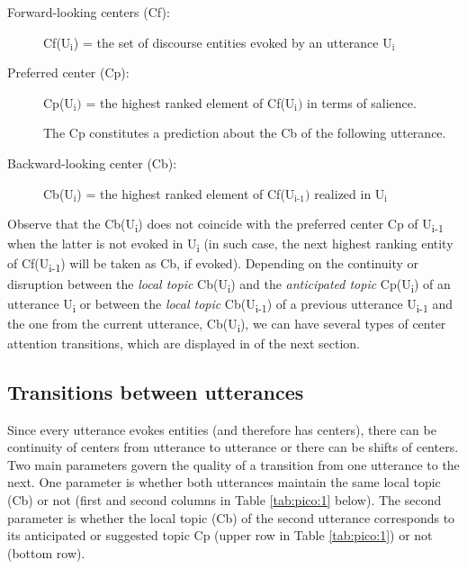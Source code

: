 \documentclass[output=paper
,modfonts
,nonflat]{langsci/langscibook}
\begin{document}
\begin{description}
\item[Forward-looking centers (Cf):] Cf(U$_\text{i}$) = the set of discourse entities evoked by an utterance U$_\text{i}$
\item[Preferred center (Cp):] Cp(U$_\text{i})$ = the highest ranked element of Cf(U$_\text{i})$ in terms of salience.

The Cp constitutes a prediction about the Cb of the following utterance.


\item[Backward-looking center (Cb):] Cb(U$_\text{i}$) = the highest ranked element of Cf(U$_\text{i-1})$ realized in U$_\text{i}$
\end{description}

Observe that the Cb(U\textsubscript{i}) does not coincide with the preferred center Cp of U\textsubscript{i-1} when the latter is not evoked in U\textsubscript{i} (in such case, the next highest ranking entity of Cf(U\textsubscript{i-1}) will be taken as Cb, if evoked). Depending on the continuity or disruption between the \textit{local topic} Cb(U\textsubscript{i}) and the \textit{anticipated topic} Cp(U\textsubscript{i}) of an utterance U\textsubscript{i} or between the \textit{local topic} Cb(U\textsubscript{i-1}) of a previous utterance U\textsubscript{i-1} and the one from the current utterance, Cb(U\textsubscript{i}), we can have several types of center attention transitions, which are displayed in  of the next section.


\subsection{Transitions between utterances}\label{sec:pico:3.3}

Since every utterance evokes entities (and therefore has centers), there can be continuity of centers from utterance to utterance or there can be shifts of centers. Two main parameters govern the quality of a transition from one utterance to the next. One parameter is whether both utterances maintain the same local topic (Cb) or not (first and second columns in Table \ref{tab:pico:1} below). The second parameter is whether the local topic (Cb) of the second utterance corresponds to its anticipated or suggested topic Cp (upper row in Table \ref{tab:pico:1}) or not (bottom row).
\end{document}
